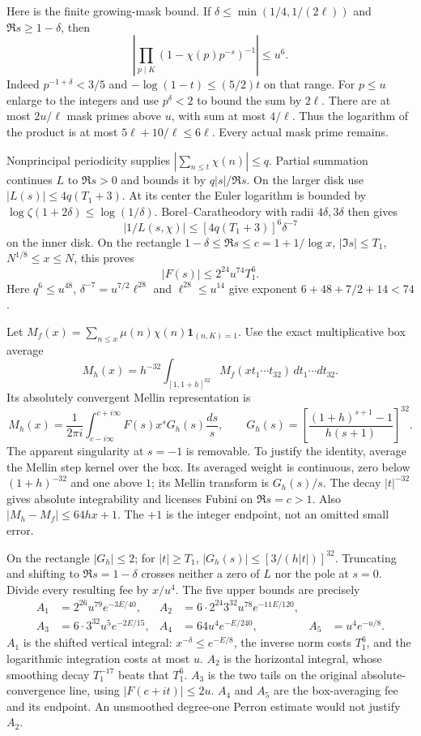 \documentclass[11pt,a4paper]{article}
\theoremstyle{definition}
\theoremstyle{remark}
\begin{document}
Here is the finite growing-mask bound. If
$\delta\leq\min(1/4,1/(2\ell))$ and $\Re s\geq1-\delta$,
then
\[
 \left|\prod_{p\mid K}(1-\chi(p)p^{-s})^{-1}\right|\leq u^6.
\]
Indeed $p^{-1+\delta}<3/5$ and
$-\log(1-t)\leq(5/2)t$ on that range. For $p\leq u$ enlarge to
the integers and use $p^\delta<2$ to bound the sum by $2\ell$.
There are at most $2u/\ell$ mask primes above $u$, with sum at most
$4/\ell$. Thus the logarithm of the product is at most
$5\ell+10/\ell\leq6\ell$. Every actual mask prime remains.

Nonprincipal periodicity supplies $|\sum_{n\leq t}\chi(n)|\leq q$.
Partial summation continues $L$ to $\Re s>0$ and bounds it by
$q|s|/\Re s$. On the larger disk use $|L(s)|\leq4q(T_1+3)$.
At its center the Euler logarithm is bounded by
$\log\zeta(1+2\delta)\leq\log(1/\delta)$.
Borel--Caratheodory with radii $4\delta,3\delta$ then gives
\[
 |1/L(s,\chi)|\leq[4q(T_1+3)]^6\delta^{-7}
\]
on the inner disk. On the rectangle
$1-\delta\leq\Re s\leq c=1+1/\log x$, $|\Im s|\leq T_1$,
$N^{1/8}\leq x\leq N$, this proves
\begin{equation}\label{eq:ext-inverse-norm}
 |F(s)|\leq2^{24}u^{74}T_1^6.
\end{equation}
Here $q^6\leq u^{48}$, $\delta^{-7}=u^{7/2}\ell^{28}$ and
$\ell^{28}\leq u^{14}$ give exponent $6+48+7/2+14<74$.

Let $M_f(x)=\sum_{n\leq x}\mu(n)\chi(n)\mathbf1_{(n,K)=1}$.
Use the exact multiplicative box average
\[
 M_h(x)=h^{-32}\int_{[1,1+h]^{32}}
                         M_f(xt_1\cdots t_{32})\,dt_1\cdots dt_{32}.
\]
Its absolutely convergent Mellin representation is
\[
 M_h(x)=\frac1{2\pi i}\int_{c-i\infty}^{c+i\infty}
       F(s)x^sG_h(s)\frac{ds}{s},\qquad
 G_h(s)=\left[\frac{(1+h)^{s+1}-1}{h(s+1)}\right]^{32}.
\]
The apparent singularity at $s=-1$ is removable. To justify the
identity, average the Mellin step kernel over the box. Its averaged
weight is continuous, zero below $(1+h)^{-32}$ and one above $1$;
its Mellin transform is $G_h(s)/s$. The decay $|t|^{-32}$ gives
absolute integrability and licenses Fubini on $\Re s=c>1$.
Also $|M_h-M_f|\leq64hx+1$. The $+1$ is the integer endpoint,
not an omitted small error.

On the rectangle $|G_h|\leq2$; for $|t|\geq T_1$,
$|G_h(s)|\leq[3/(h|t|)]^{32}$. Truncating and shifting to
$\Re s=1-\delta$ crosses neither a zero of $L$ nor the pole at
$s=0$. Divide every resulting fee by $x/u^4$. The five upper bounds
are precisely
\begin{align}
 A_1&=2^{26}u^{79}e^{-3E/40},&
 A_2&=6\cdot2^{24}3^{32}u^{78}e^{-11E/120},\nonumber\\
 A_3&=6\cdot3^{32}u^5e^{-2E/15},&
 A_4&=64u^4e^{-E/240},&
 A_5&=u^4e^{-u/8}.\label{eq:ext-fivefees}
\end{align}
$A_1$ is the shifted vertical integral: $x^{-\delta}\leq e^{-E/8}$,
the inverse norm costs $T_1^6$, and the logarithmic integration
costs at most $u$. $A_2$ is the horizontal integral, whose smoothing
decay $T_1^{-17}$ beats that $T_1^6$. $A_3$ is the two tails on
the original absolute-convergence line, using $|F(c+it)|\leq2u$.
$A_4$ and $A_5$ are the box-averaging fee and its endpoint.
An unsmoothed degree-one Perron estimate would not justify $A_2$.
\end{document}
